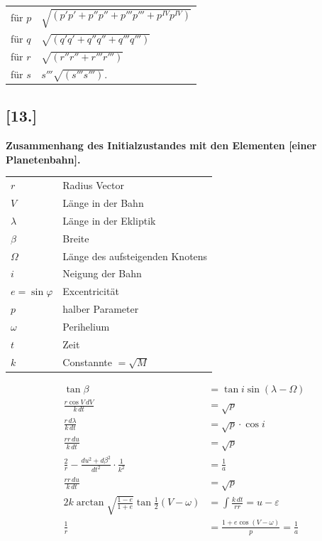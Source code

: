 \documentclass[12pt,a4paper]{article}
\begin{document}
\newpage

\begin{center}
\begin{tabular}{ll}
f\"ur $p$ & $\sqrt{(p'p' + p''p'' + p'''p''' + p^{IV}p^{IV})}$ \\
f\"ur $q$ & $\sqrt{(q'q' + q''q'' + q'''q''')}$ \\
f\"ur $r$ & $\sqrt{(r''r'' + r'''r''')}$ \\
f\"ur $s$ & $s'''\sqrt{(s'''s''')}$.
\end{tabular}
\end{center}

\subsection*{[13.]}
\textbf{Zusammenhang des Initialzustandes mit den Elementen [einer Planetenbahn].}

\begin{center}
\begin{tabular}{ll}
$r$ & Radius Vector \\
$V$ & L\"ange in der Bahn \\
$\lambda$ & L\"ange in der Ekliptik \\
$\beta$ & Breite \\
$\Omega$ & L\"ange des aufsteigenden Knotens \\
$i$ & Neigung der Bahn \\
$e = \sin\varphi$ & Excentricit\"at \\
$p$ & halber Parameter \\
$\omega$ & Perihelium \\
$t$ & Zeit \\
$k$ & Constannte $= \sqrt{M}$
\end{tabular}
\end{center}

\begin{align}
\tag{1} \tan\beta &= \tan i \sin(\lambda - \Omega) \\
\tag{2} \frac{r\cos V\,dV}{k\,dt} &= \sqrt{p} \\
\tag{3} \frac{r\,d\lambda}{k\,dt} &= \sqrt{p} \cdot \cos i \\
\tag{4} \frac{rr\,du}{k\,dt} &= \sqrt{p} \\
\tag{5} \frac{2}{r} - \frac{du^2 + d\beta^2}{dt^2} \cdot \frac{1}{k^2} &= \frac{1}{a} \\
\tag{6} \frac{rr\,du}{k\,dt} &= \sqrt{p} \\
\tag{7} 2k \arctan\sqrt{\frac{1 - e}{1 + e}} \tan\tfrac{1}{2}(V - \omega) &= \int \frac{k\,dt}{rr} = u - \varepsilon \\
\tag{8} \frac{1}{r} &= \frac{1 + e\cos(V - \omega)}{p} = \frac{1}{a}
\end{align}
\end{document}
